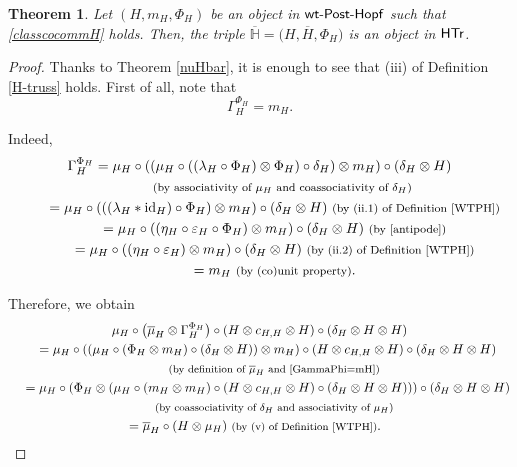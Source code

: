 \documentclass[10pt,a4paper]{amsart}
\numberwithin{equation}{section}
\newtheorem{Theorem}{Theorem}[section]
\begin{document}
\begin{Theorem}\label{Prop: Weak-nuHTr}
Let $(H,m_{H},\Phi_{H})$ be an object in ${\sf wt}\textnormal{-}\sf{Post}\textnormal{-}\sf{Hopf}$ such that \eqref{classcocommH} holds. Then, the triple
$\overline{\mathbb{H}}=\bigl(H,\overline{H},\Phi_{H}\bigr)$
is an object in $\sf{HTr}$.
\end{Theorem}
\begin{proof}
Thanks to Theorem \ref{nuHbar}, it is enough to see that (iii) of Definition \ref{H-truss} holds. First of all, note that \begin{equation}\label{GammaPhi=mH}\Gamma_{H}^{\Phi_{H}}=m_{H}.\end{equation}

Indeed,
\begin{gather*}
 \Gamma_{H}^{\Phi_{H}}= \mu_{H}\circ((\mu_{H}\circ((\lambda_{H}\circ\Phi_{H})\otimes\Phi_{H})\circ\delta_{H})\otimes m_{H})\circ(\delta_{H}\otimes H)\\
 \hphantom{\Gamma_{H}^{\Phi_{H}}=}{}\ \text{\footnotesize\textnormal{(by associativity of $\mu_{H}$ and coassociativity of $\delta_{H}$)}}\\
 \hphantom{\Gamma_{H}^{\Phi_{H}}}{}= \mu_{H}\circ(((\lambda_{H}\ast {\rm id}_{H})\circ\Phi_{H})\otimes m_{H})\circ(\delta_{H}\otimes H)\ \text{\footnotesize\textnormal{(by (ii.1) of Definition \ref{WTPH})}}\\
 \hphantom{\Gamma_{H}^{\Phi_{H}}}{}= \mu_{H}\circ((\eta_{H}\circ\varepsilon_{H}\circ\Phi_{H})\otimes m_{H})\circ(\delta_{H}\otimes H)\ \text{\footnotesize\textnormal{(by \eqref{antipode})}}\\
 \hphantom{\Gamma_{H}^{\Phi_{H}}}{}= \mu_{H}\circ((\eta_{H}\circ\varepsilon_{H})\otimes m_{H})\circ(\delta_{H}\otimes H)\ \text{\footnotesize\textnormal{(by (ii.2) of Definition \ref{WTPH})}}\\
 \hphantom{\Gamma_{H}^{\Phi_{H}}}{}= m_{H}\ \text{\footnotesize\textnormal{(by (co)unit property)}}.
\end{gather*}

Therefore, we obtain
\begin{gather*}
 \mu_{H}\circ\bigl(\overline{\mu}_{H}\otimes\Gamma_{H}^{\Phi_{H}}\bigr)\circ(H\otimes c_{H,H}\otimes H)\circ(\delta_{H}\otimes H\otimes H)\\
 \quad{}= \mu_{H}\circ((\mu_{H}\circ(\Phi_{H}\otimes m_{H})\circ(\delta_{H}\otimes H))\otimes m_{H})\circ(H\otimes c_{H,H}\otimes H)\circ(\delta_{H}\otimes H\otimes H)\\
 \qquad{}\;\text{\footnotesize\textnormal{(by definition of $\overline{\mu}_{H}$ and \eqref{GammaPhi=mH})}}\\
 \quad{}= \mu_{H}\circ(\Phi_{H}\otimes(\mu_{H}\circ(m_{H}\otimes m_{H})\circ(H\otimes c_{H,H}\otimes H)\circ(\delta_{H}\otimes H\otimes H)))\circ(\delta_{H}\otimes H\otimes H)\\
 \qquad{}\;\text{\footnotesize\textnormal{(by coassociativity of $\delta_{H}$ and associativity of $\mu_{H}$)}}\\
 \quad{}= \overline{\mu}_{H}\circ(H\otimes\mu_{H})\ \text{\footnotesize\textnormal{(by (v) of Definition \ref{WTPH})}}.
 \tag*{\qed}
\end{gather*}
\renewcommand{\qed}{}
\end{proof}
\end{document}
